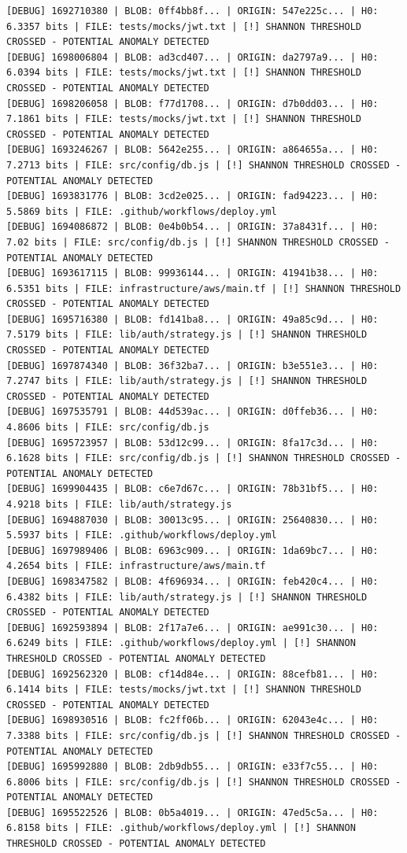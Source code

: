 \documentclass[12pt, a4paper, oneside]{report}
\begin{document}
\begin{lstlisting}[basicstyle=\tiny\ttfamily]
[DEBUG] 1692710380 | BLOB: 0ff4bb8f... | ORIGIN: 547e225c... | H0: 6.3357 bits | FILE: tests/mocks/jwt.txt | [!] SHANNON THRESHOLD CROSSED - POTENTIAL ANOMALY DETECTED
[DEBUG] 1698006804 | BLOB: ad3cd407... | ORIGIN: da2797a9... | H0: 6.0394 bits | FILE: tests/mocks/jwt.txt | [!] SHANNON THRESHOLD CROSSED - POTENTIAL ANOMALY DETECTED
[DEBUG] 1698206058 | BLOB: f77d1708... | ORIGIN: d7b0dd03... | H0: 7.1861 bits | FILE: tests/mocks/jwt.txt | [!] SHANNON THRESHOLD CROSSED - POTENTIAL ANOMALY DETECTED
[DEBUG] 1693246267 | BLOB: 5642e255... | ORIGIN: a864655a... | H0: 7.2713 bits | FILE: src/config/db.js | [!] SHANNON THRESHOLD CROSSED - POTENTIAL ANOMALY DETECTED
[DEBUG] 1693831776 | BLOB: 3cd2e025... | ORIGIN: fad94223... | H0: 5.5869 bits | FILE: .github/workflows/deploy.yml
[DEBUG] 1694086872 | BLOB: 0e4b0b54... | ORIGIN: 37a8431f... | H0: 7.02 bits | FILE: src/config/db.js | [!] SHANNON THRESHOLD CROSSED - POTENTIAL ANOMALY DETECTED
[DEBUG] 1693617115 | BLOB: 99936144... | ORIGIN: 41941b38... | H0: 6.5351 bits | FILE: infrastructure/aws/main.tf | [!] SHANNON THRESHOLD CROSSED - POTENTIAL ANOMALY DETECTED
[DEBUG] 1695716380 | BLOB: fd141ba8... | ORIGIN: 49a85c9d... | H0: 7.5179 bits | FILE: lib/auth/strategy.js | [!] SHANNON THRESHOLD CROSSED - POTENTIAL ANOMALY DETECTED
[DEBUG] 1697874340 | BLOB: 36f32ba7... | ORIGIN: b3e551e3... | H0: 7.2747 bits | FILE: lib/auth/strategy.js | [!] SHANNON THRESHOLD CROSSED - POTENTIAL ANOMALY DETECTED
[DEBUG] 1697535791 | BLOB: 44d539ac... | ORIGIN: d0ffeb36... | H0: 4.8606 bits | FILE: src/config/db.js
[DEBUG] 1695723957 | BLOB: 53d12c99... | ORIGIN: 8fa17c3d... | H0: 6.1628 bits | FILE: src/config/db.js | [!] SHANNON THRESHOLD CROSSED - POTENTIAL ANOMALY DETECTED
[DEBUG] 1699904435 | BLOB: c6e7d67c... | ORIGIN: 78b31bf5... | H0: 4.9218 bits | FILE: lib/auth/strategy.js
[DEBUG] 1694887030 | BLOB: 30013c95... | ORIGIN: 25640830... | H0: 5.5937 bits | FILE: .github/workflows/deploy.yml
[DEBUG] 1697989406 | BLOB: 6963c909... | ORIGIN: 1da69bc7... | H0: 4.2654 bits | FILE: infrastructure/aws/main.tf
[DEBUG] 1698347582 | BLOB: 4f696934... | ORIGIN: feb420c4... | H0: 6.4382 bits | FILE: lib/auth/strategy.js | [!] SHANNON THRESHOLD CROSSED - POTENTIAL ANOMALY DETECTED
[DEBUG] 1692593894 | BLOB: 2f17a7e6... | ORIGIN: ae991c30... | H0: 6.6249 bits | FILE: .github/workflows/deploy.yml | [!] SHANNON THRESHOLD CROSSED - POTENTIAL ANOMALY DETECTED
[DEBUG] 1692562320 | BLOB: cf14d84e... | ORIGIN: 88cefb81... | H0: 6.1414 bits | FILE: tests/mocks/jwt.txt | [!] SHANNON THRESHOLD CROSSED - POTENTIAL ANOMALY DETECTED
[DEBUG] 1698930516 | BLOB: fc2ff06b... | ORIGIN: 62043e4c... | H0: 7.3388 bits | FILE: src/config/db.js | [!] SHANNON THRESHOLD CROSSED - POTENTIAL ANOMALY DETECTED
[DEBUG] 1695992880 | BLOB: 2db9db55... | ORIGIN: e33f7c55... | H0: 6.8006 bits | FILE: src/config/db.js | [!] SHANNON THRESHOLD CROSSED - POTENTIAL ANOMALY DETECTED
[DEBUG] 1695522526 | BLOB: 0b5a4019... | ORIGIN: 47ed5c5a... | H0: 6.8158 bits | FILE: .github/workflows/deploy.yml | [!] SHANNON THRESHOLD CROSSED - POTENTIAL ANOMALY DETECTED
\end{lstlisting}
\end{document}
